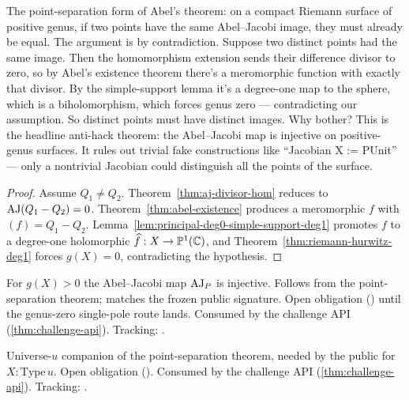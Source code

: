 \begin{layman}
The point-separation form of Abel's theorem: on a compact Riemann
surface of positive genus, if two points have the same Abel--Jacobi
image, they must already be equal. The argument is by contradiction.
Suppose two distinct points had the same image. Then the homomorphism
extension sends their difference divisor to zero, so by Abel's
existence theorem there's a meromorphic function with exactly that
divisor. By the simple-support lemma it's a degree-one map to the
sphere, which is a biholomorphism, which forces genus zero ---
contradicting our assumption. So distinct points must have distinct
images. Why bother? This is the headline anti-hack theorem: the
Abel--Jacobi map is injective on positive-genus surfaces. It rules out
trivial fake constructions like ``Jacobian X := PUnit'' --- only a
nontrivial Jacobian could distinguish all the points of the
surface.
\end{layman}

\begin{proof}\leanok
Assume \(Q_1\ne Q_2\). Theorem~\ref{thm:aj-divisor-hom} reduces to
\(\operatorname{AJ}(Q_1-Q_2)=0\). Theorem~\ref{thm:abel-existence} produces a
meromorphic \(f\) with \((f)=Q_1-Q_2\).
Lemma~\ref{lem:principal-deg0-simple-support-deg1} promotes \(f\) to a
degree-one holomorphic \(\widehat f:X\to\mathbb{P}^{1}(\mathbb{C})\), and
Theorem~\ref{thm:riemann-hurwitz-deg1} forces \(g(X)=0\), contradicting
the hypothesis.
\end{proof}

\begin{lemma}
\label{lem:analytic-of-curve-injective}
For \(g(X)>0\) the Abel--Jacobi map \(\operatorname{AJ}_P\) is injective. Follows from the
point-separation theorem; matches the frozen public 
signature. Open obligation () until the genus-zero single-pole
route lands. Consumed by the challenge API (\ref{thm:challenge-api}).
Tracking: .
\end{lemma}

\begin{lemma}
\label{lem:path-integral-functional-separates-points-u}
Universe-\(u\) companion of the point-separation theorem, needed by the public
 for \(X:\mathrm{Type}\,u\). Open obligation
(). Consumed by the challenge API (\ref{thm:challenge-api}).
Tracking: .
\end{lemma}

